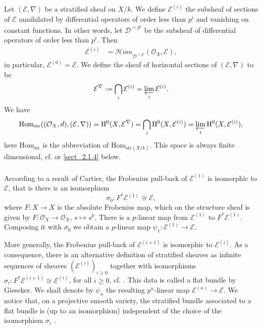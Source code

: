 \documentclass[12pt,a4]{amsart}
\theoremstyle{definition}
\begin{document}
\subsubsection{} \label{sect_stratified_hom}
Let $(\mathcal E,\nabla)$ be a stratified sheaf on $X/k.$ We define
$\mathcal E^{(i)}$ the subsheaf of sections of $\mathcal E$ 
annihilated by differential 
operators of order less than $p^i$ and vanishing on constant functions.
In other words, let $\mathcal{D}^{<p^{i}}$ be the subsheaf of differential
operators of order less than $p^{i}$. Then  
\begin{align*}
\mathcal E^{(i)} &  = \mathcal{H}\textit{om}_{\mathcal{D}^{<p^{i}}}(\mathcal{O}_X, \mathcal E),
\end{align*}
in particular, $\mathcal E^{(0)}=\mathcal E$. 
We define the sheaf of horizontal sections of 
$(\mathcal E,\nabla)$ to be
$$\mathcal E^{\nabla}:= \bigcap_i \mathcal E^{(i)} = \varprojlim_i \mathcal E^{(i)}.$$
We have
$$\mathrm{Hom}_\text{str}((\mathcal O_X,d),(\mathcal E,\nabla))=
\mathrm{H}^0(X,\mathcal E^{\nabla})=\bigcap_i\mathrm{H}^0(X, \mathcal E^{(i)})= 
\varprojlim_i \mathrm{H}^0(X,\mathcal  E^{(i)}),$$
here $\mathrm{Hom}_\text{str}$ is the abbreviation of $\mathrm{Hom}_\text{str$(X/k)$}$.
This space is always finite dimensional, cf. \cite[Lemma~1.5]{Hai13} or \ref{sect_2.1.4} below. 

\subsubsection{} \label{sect_2.1.3}
According to a result of Cartier, the Frobenius pull-back of $\mathcal E^{(1)}$ is
isomorphic to $\mathcal E$, that is there is an isomorphism
$$\sigma_0:F^*\mathcal E^{(1)}\cong \mathcal E,$$
where $F: X\longrightarrow X$ is the absolute Frobenius map,
which on the structure sheaf is given by 
$F:\mathcal O_{X}\longrightarrow \mathcal O_X$,
$s\mapsto s^p.$
There is a $p$-linear map from $\mathcal E^{(1)}$ to $F^*\mathcal E^{(1)}$.
Composing it with $\sigma_0$ we obtain a $p$-linear map $\psi_1:\mathcal E^{(1)}
\longrightarrow \mathcal E$. 


More generally, the Frobenius pull-back of 
$\mathcal E^{(i+1)}$ is isomorphic to $\mathcal E^{(i)}.$ 
As a consequence, there is an alternative
definition of  stratified sheaves as infinite sequences of sheaves
$(\mathcal E^{(i)})_{i\geq 0}$ together with isomorphisms
$\sigma_i: F^*\mathcal E^{(i+1)}\cong \mathcal E^{(i)}$, for all $i\geq 0$, cf. \cite{Gie75}.
This data is called a flat bundle by Gieseker.
We shall denote by $\psi_n$ the resulting $p^n$-linear map $\mathcal E^{(n)}\longrightarrow
\mathcal E$. 
 We notice that, on a projective smooth variety, the stratified bundle
associated to a flat bundle is (up to an isomorphism) independent of the choice
of the isomorphism $\sigma_i$ \cite[Lemma~1.7]{Gie75}. 
\end{document}
